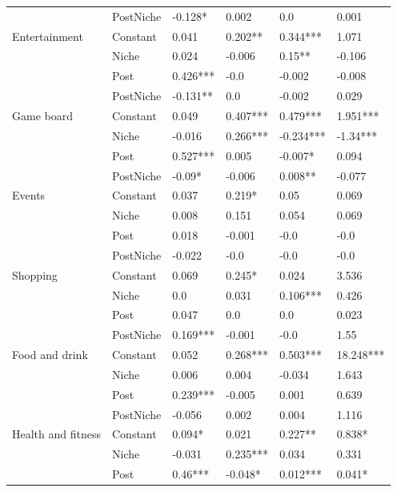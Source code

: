 \begin{table}[h!]
\begin{tabular}{llllll}
          & PostNiche &  -0.128* &  0.002 &  0.0 &  0.001 \\
\cline{1-6}
\multirow{4}{*}{Entertainment} & Constant &  0.041 &  0.202** &  0.344*** &  1.071 \\
          & Niche &  0.024 &  -0.006 &  0.15** &  -0.106 \\
          & Post &  0.426*** &  -0.0 &  -0.002 &  -0.008 \\
          & PostNiche &  -0.131** &  0.0 &  -0.002 &  0.029 \\
\cline{1-6}
\multirow{4}{*}{Game board} & Constant &  0.049 &  0.407*** &  0.479*** &  1.951*** \\
          & Niche &  -0.016 &  0.266*** &  -0.234*** &  -1.34*** \\
          & Post &  0.527*** &  0.005 &  -0.007* &  0.094 \\
          & PostNiche &  -0.09* &  -0.006 &  0.008** &  -0.077 \\
\cline{1-6}
\multirow{4}{*}{Events} & Constant &  0.037 &  0.219* &  0.05 &  0.069 \\
          & Niche &  0.008 &  0.151 &  0.054 &  0.069 \\
          & Post &  0.018 &  -0.001 &  -0.0 &  -0.0 \\
          & PostNiche &  -0.022 &  -0.0 &  -0.0 &  -0.0 \\
\cline{1-6}
\multirow{4}{*}{Shopping} & Constant &  0.069 &  0.245* &  0.024 &  3.536 \\
          & Niche &  0.0 &  0.031 &  0.106*** &  0.426 \\
          & Post &  0.047 &  0.0 &  0.0 &  0.023 \\
          & PostNiche &  0.169*** &  -0.001 &  -0.0 &  1.55 \\
\cline{1-6}
\multirow{4}{*}{Food and drink} & Constant &  0.052 &  0.268*** &  0.503*** &  18.248*** \\
          & Niche &  0.006 &  0.004 &  -0.034 &  1.643 \\
          & Post &  0.239*** &  -0.005 &  0.001 &  0.639 \\
          & PostNiche &  -0.056 &  0.002 &  0.004 &  1.116 \\
\cline{1-6}
\multirow{4}{*}{Health and fitness} & Constant &  0.094* &  0.021 &  0.227** &  0.838* \\
          & Niche &  -0.031 &  0.235*** &  0.034 &  0.331 \\
          & Post &  0.46*** &  -0.048* &  0.012*** &  0.041* \\

\end{tabular}
\end{table}
